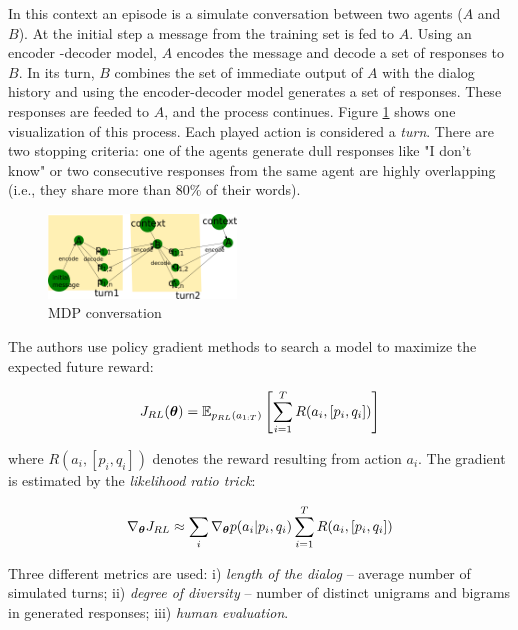 \par In this context an episode is a simulate conversation between two agents ($A$ and $B$). At the initial step a message from the training set is fed to $A$. Using an encoder -decoder model, $A$ encodes the message and decode a set of responses to $B$. In its turn, $B$ combines the set of immediate output of $A$ with the dialog history and using the encoder-decoder model generates a set of responses. These responses are feeded to $A$, and the process continues. Figure \ref{MDPConver} shows one visualization of this process. Each played action is considered a \textit{turn}. There are two stopping criteria: one of the agents generate dull responses like "I don't know" or two consecutive responses from the same agent are highly overlapping (i.e., they share more than $80\%$ of their words).


\begin{figure}[ht!]
\label{MDPConver}
\includegraphics[width=5cm]{img/MDPconversation_placeholder.png}
\caption{MDP conversation}
\end{figure}

\par The authors use policy gradient methods to search a model to maximize the expected future reward:

\begin{equation}
J_{RL}(\bm{\theta}) = \operatorname{\mathbb{E}}_{p_{RL}(a_{1:T})} \left[\sum_{i=1}^{T} R(a_i, [p_i, q_i]) \right]
\end{equation}

where $R(a_i, [p_i, q_i])$ denotes the reward resulting from action $a_i$. The gradient is estimated by the \textit{likelihood ratio trick}:

\begin{equation}
\nabla_{\bm{\theta}} {J_{RL}} \approx \sum_{i} \nabla_{\bm{\theta}} {p(a_{i} | p_{i}, q_{i})} \sum_{i=1}^{T}R(a_i, [p_{i}, q_{i}])
\end{equation}

\par Three different metrics are used: i) \textit{length of the dialog} -- average number of simulated turns; ii) \textit{degree of diversity} -- number of distinct unigrams and bigrams in generated responses; iii) \textit{human evaluation}.

